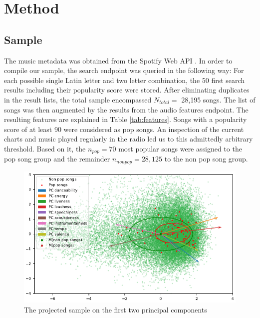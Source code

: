 \documentclass{article}
\begin{document}
\section{Method}


\subsection{Sample}
The music metadata was obtained from the Spotify Web API \citep{spotifyAPIdocu}.
In order to compile our sample, the search endpoint was queried in the following way: For each possible single Latin letter and two letter combination, the 50 first search results including their popularity score were stored. After eliminating duplicates in the result lists, the total sample encompassed \(N_{total} =\) 28,195 songs. The list of songs was then augmented by the results from the audio features endpoint.
The resulting features are explained in Table \ref{tab:features}. Songs with a popularity score of at least 90 were considered as pop songs. An inspection of the current charts and music played regularly in the radio led us to this admittedly arbitrary threshold. Based on it, the \(n_{pop} = 70\) most popular songs were assigned to the pop song group and the remainder \(n_{non pop} = 28,125\) to the non pop song group.

\begin{figure}
  \centering
  \includegraphics[]{../fig/001_pca.pdf}
  \caption{The projected sample on the first two principal components}
  \label{fig:pca}
\end{figure}
\end{document}
